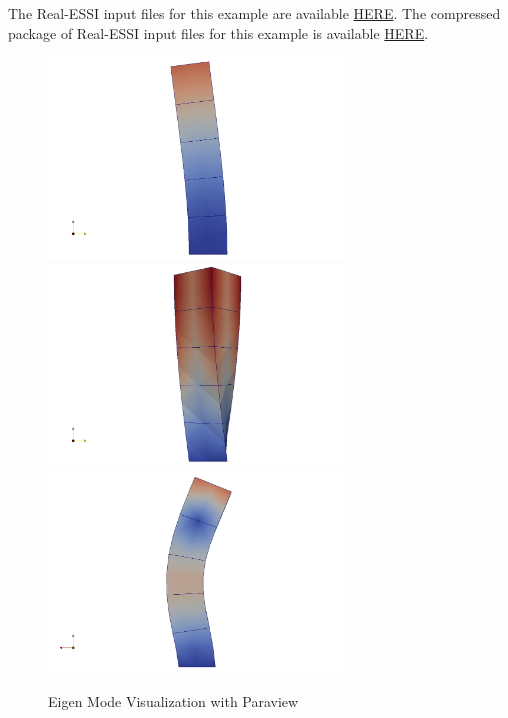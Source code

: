 The Real-ESSI input files for this example are available 
\href{http://cml01.engr.ucdavis.edu/shortCourse/Day1/Postprocess_examples_with_Paraview/eigen}{HERE}. 
The compressed package of Real-ESSI input files for this example is available 
\href{http://cml01.engr.ucdavis.edu/shortCourse/Day1/Postprocess_examples_with_Paraview/eigen/eigen.tgz}{HERE}.  

\begin{figure}[H]
  \centering
  \includegraphics[width = 8cm]{./Figure-files/Day1/Postprocess_examples_with_Paraview/eigenmode1.jpg}
  \includegraphics[width = 8cm]{./Figure-files/Day1/Postprocess_examples_with_Paraview/eigenmode2.jpg}
  \includegraphics[width = 8cm]{./Figure-files/Day1/Postprocess_examples_with_Paraview/eigenmode3.jpg}
  \caption{Eigen Mode Visualization with Paraview}
  \label{fig_paraview_eigen}
\end{figure}


\clearpage
\newpage
